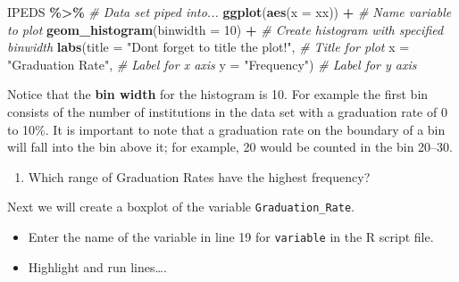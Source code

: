 \documentclass[
]{report}
\newenvironment{Shaded}{\begin{snugshade}}{\end{snugshade}}
\newcommand{\AttributeTok}[1]{\textcolor[rgb]{0.13,0.29,0.53}{#1}}
\newcommand{\CommentTok}[1]{\textcolor[rgb]{0.56,0.35,0.01}{\textit{#1}}}
\newcommand{\DecValTok}[1]{\textcolor[rgb]{0.00,0.00,0.81}{#1}}
\newcommand{\FunctionTok}[1]{\textcolor[rgb]{0.13,0.29,0.53}{\textbf{#1}}}
\newcommand{\NormalTok}[1]{#1}
\newcommand{\SpecialCharTok}[1]{\textcolor[rgb]{0.81,0.36,0.00}{\textbf{#1}}}
\newcommand{\StringTok}[1]{\textcolor[rgb]{0.31,0.60,0.02}{#1}}
\providecommand{\tightlist}{%
  \setlength{\itemsep}{0pt}\setlength{\parskip}{0pt}}
\begin{document}
\begin{Shaded}
\begin{Highlighting}[]
\NormalTok{IPEDS }\SpecialCharTok{\%\textgreater{}\%} \CommentTok{\# Data set piped into...}
\FunctionTok{ggplot}\NormalTok{(}\FunctionTok{aes}\NormalTok{(}\AttributeTok{x =}\NormalTok{ xx)) }\SpecialCharTok{+}   \CommentTok{\# Name variable to plot}
  \FunctionTok{geom\_histogram}\NormalTok{(}\AttributeTok{binwidth =} \DecValTok{10}\NormalTok{) }\SpecialCharTok{+}  \CommentTok{\# Create histogram with specified binwidth}
  \FunctionTok{labs}\NormalTok{(}\AttributeTok{title =} \StringTok{"Don\textquotesingle{}t forget to title the plot!"}\NormalTok{, }\CommentTok{\# Title for plot}
       \AttributeTok{x =} \StringTok{"Graduation Rate"}\NormalTok{, }\CommentTok{\# Label for x axis}
       \AttributeTok{y =} \StringTok{"Frequency"}\NormalTok{) }\CommentTok{\# Label for y axis}
\end{Highlighting}
\end{Shaded}

Notice that the \textbf{bin width} for the histogram is 10. For example the first bin consists of the number of institutions in the data set with a graduation rate of 0 to 10\%. It is important to note that a graduation rate on the boundary of a bin will fall into the bin above it; for example, 20 would be counted in the bin 20--30.

\begin{enumerate}
\def\labelenumi{\arabic{enumi}.}
\setcounter{enumi}{5}
\tightlist
\item
  Which range of Graduation Rates have the highest frequency?
\end{enumerate}

\vspace{0.2in}

Next we will create a boxplot of the variable \texttt{Graduation\_Rate}.

\begin{itemize}
\item
  Enter the name of the variable in line 19 for \texttt{variable} in the R script file.
\item
  Highlight and run lines\ldots.
\end{itemize}
\end{document}
